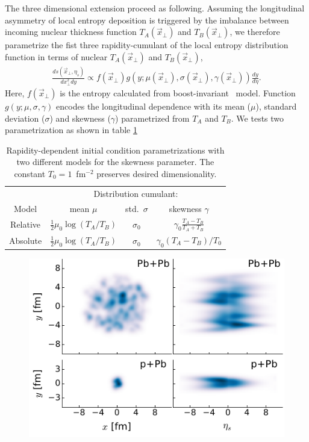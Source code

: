 \documentclass[3p,times,twocolumn]{elsarticle}
\begin{document}
The three dimensional extension proceed as following. 
Assuming the longitudinal asymmetry of local entropy deposition is triggered by the imbalance between incoming nuclear thickness function $T_A(\vec{x}_{\perp})$ and $T_B(\vec{x}_{\perp})$, we therefore parametrize the fist three rapidity-cumulant of the local entropy distribution function in terms of nuclear $T_A(\vec{x}_{\perp})$ and $T_B(\vec{x}_{\perp})$,
\begin{eqnarray}
\frac{ds(\vec{x}_{\perp}, \eta_s)}{dx_{\perp}^2 dy} \propto f(\vec{x}_{\perp})g(y; \mu(\vec{x}_{\perp}), \sigma(\vec{x}_{\perp}), \gamma(\vec{x}_{\perp}))\frac{dy}{d\eta}.
\end{eqnarray}
Here, $f(\vec{x}_{\perp})$ is the entropy calculated from boost-invariant \trento~model. Function $g(y; \mu, \sigma, \gamma)$ encodes the longitudinal dependence with its mean ($\mu$), standard deviation ($\sigma$) and skewness ($\gamma$) parametrized from $T_A$ and $T_B$.
We tests two parametrization as shown in table \ref{tab:parametrization}

\begin{table}
  \caption{
    \label{tab:parametrization}
    Rapidity-dependent initial condition parametrizations with two different models for the skewness parameter. The constant $T_0 = 1$~fm$^{-2}$ preserves desired dimensionality.
  }
  \begin{tabular}{cccc}
\hline\hline
      & \multicolumn{3}{c}{Distribution cumulant:} \\
      Model & \multicolumn{1}{c}{mean $\mu$} & \multicolumn{1}{c}{std.\ $\sigma$} & \multicolumn{1}{c}{skewness $\gamma$} \\
\hline
        Relative  & $\frac{1}{2} \mu_0 \log(T_A/T_B)$ & $\sigma_0$ & $\gamma_0 \frac{T_A - T_B}{T_A + T_B}$ \smallskip \\
        Absolute & $\frac{1}{2} \mu_0 \log(T_A/T_B)$  & $\sigma_0$ & $\gamma_0 (T_A - T_B)/T_0$ \\
\hline\hline
  \end{tabular}
\end{table}

\begin{figure}
\includegraphics[width=\columnwidth]{trento3d_example.pdf}
\end{figure}
\end{document}

